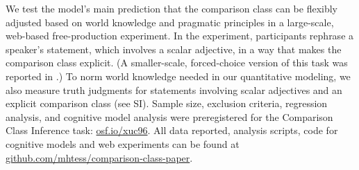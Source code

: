 \documentclass[doc, floatsintext]{apa6}
\newcommand{\mht}[1]{\textcolor{Blue}{[mht: #1]}}
\begin{document}
We test the model's main prediction that the comparison class can be flexibly adjusted based on world knowledge and pragmatic principles in a large-scale, web-based free-production experiment.
In the experiment, participants rephrase a speaker's statement, which involves a scalar adjective, in a way that makes the comparison class explicit.
(A smaller-scale, forced-choice version of this task was reported in .)
To norm world knowledge needed in our quantitative modeling, we also measure truth judgments for statements involving scalar adjectives and an explicit comparison class (see SI).
Sample size, exclusion criteria, regression analysis, and cognitive model analysis were preregistered for the Comparison Class Inference task: \url{osf.io/xuc96}.
All data reported, analysis scripts, code for cognitive models and web experiments can be found at \url{github.com/mhtess/comparison-class-paper}.









%
%
%
\end{document}
